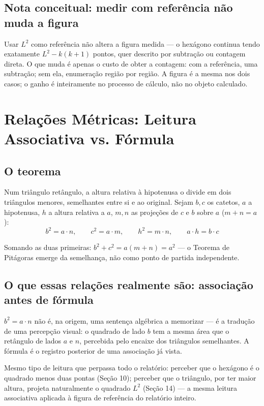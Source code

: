 \documentclass[11pt,a4paper]{article}
\begin{document}
\subsection{Nota conceitual: medir com referência não muda a figura}

Usar $L^2$ como referência não altera a figura medida --- o hexágono continua tendo exatamente $L^2 - k(k+1)$ pontos, quer descrito por subtração ou contagem direta. O que muda é apenas o custo de obter a contagem: com a referência, uma subtração; sem ela, enumeração região por região. A figura é a mesma nos dois casos; o ganho é inteiramente no processo de cálculo, não no objeto calculado.

\section{Relações Métricas: Leitura Associativa vs. Fórmula}

\subsection{O teorema}

Num triângulo retângulo, a altura relativa à hipotenusa o divide em dois triângulos menores, semelhantes entre si e ao original. Sejam $b,c$ os catetos, $a$ a hipotenusa, $h$ a altura relativa a $a$, $m,n$ as projeções de $c$ e $b$ sobre $a$ ($m+n=a$):
\[
b^2 = a \cdot n, \qquad c^2 = a \cdot m, \qquad h^2 = m \cdot n, \qquad a \cdot h = b \cdot c
\]

Somando as duas primeiras: $b^2+c^2 = a(m+n) = a^2$ --- o Teorema de Pitágoras emerge da semelhança, não como ponto de partida independente.

\subsection{O que essas relações realmente são: associação antes de fórmula}

$b^2 = a \cdot n$ não é, na origem, uma sentença algébrica a memorizar --- é a tradução de uma percepção visual: o quadrado de lado $b$ tem a mesma área que o retângulo de lados $a$ e $n$, percebida pelo encaixe dos triângulos semelhantes. A fórmula é o registro posterior de uma associação já vista.

Mesmo tipo de leitura que perpassa todo o relatório: perceber que o hexágono é o quadrado menos duas pontas (Seção 10); perceber que o triângulo, por ter maior altura, projeta naturalmente o quadrado $L^2$ (Seção 14) --- a mesma leitura associativa aplicada à figura de referência do relatório inteiro.
\end{document}
